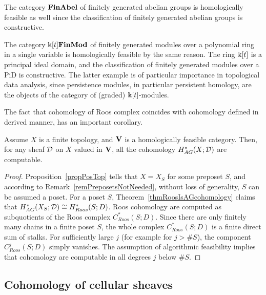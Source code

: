 \begin{ex}\label{exAbelFeasible}
The category $\mathbf{FinAbel}$ of finitely generated abelian groups is homologically feasible as well since the classification of finitely generated abelian groups is constructive.
\end{ex}

\begin{ex}\label{exPolyModulesFeasible}
The category $\Bbbk[t]\mathbf{FinMod}$ of finitely generated modules over a polynomial ring in a single variable is homologically feasible by the same reason. The ring $\Bbbk[t]$ is a principal ideal domain, and the classification of finitely generated modules over a PiD is constructive. The latter example is of particular importance in topological data analysis, since persistence modules, in particular persistent homology, are the objects of the category of (graded) $\Bbbk[t]$-modules.
\end{ex}

The fact that cohomology of Roos complex coincides with cohomology defined in derived manner, has an important corollary.

\begin{cor}\label{corComputabilityPosets}
Assume $X$ is a finite topology, and $\mathbf{V}$ is a homologically feasible category. Then, for any sheaf $\mathcal{D}$ on $X$ valued in $\mathbf{V}$, all the cohomology $H^*_{AG}(X;\mathcal{D})$ are computable.
\end{cor}

\begin{proof}
Proposition~\ref{propPosTop} tells that $X=X_S$ for some preposet $S$, and according to Remark~\ref{remPreposetsNotNeeded}, without loss of generality, $S$ can be assumed a poset. For a poset $S$, Theorem~\ref{thmRoosIsAGcohomology} claims that $H^*_{AG}(X_S;\mathcal{D})\cong H^*_{Roos}(S;D)$. Roos cohomology are computed as subquotients of the Roos complex $C^*_{Roos}(S;D)$. Since there are only finitely many chains in a finite poset $S$, the whole complex $C^*_{Roos}(S;D)$ is a finite direct sum of stalks. For sufficiently large $j$ (for example for $j>\#S$), the component $C^j_{Roos}(S;D)$ simply vanishes. The assumption of algorithmic feasibility implies that cohomology are computable in all degrees $j$ below $\#S$.
\end{proof}

\subsection{Cohomology of cellular sheaves}\label{subsecMathCohomologyCellular}

